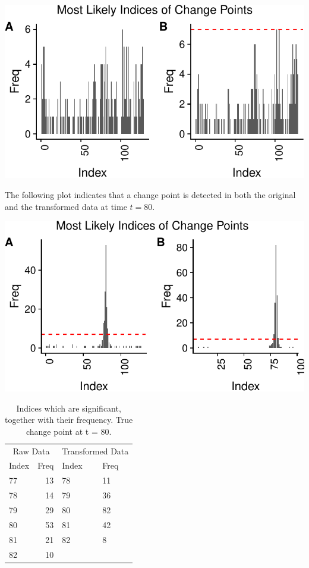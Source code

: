 \documentclass[smallextended]{svjour3}       %
\begin{document}
\begin{center}\includegraphics{springer_template_files/figure-latex/chunk_3-1} \end{center}

The following plot indicates that a change point is detected in both the
original and the transformed data at time \(t = 80\).

\begin{center}\includegraphics{springer_template_files/figure-latex/chunk_4_5-1} \end{center}

\begin{longtable}[t]{lrll}
\caption{\label{tab:chunk_4_5}Indices which are significant, together with their frequency. True change point at t = 80.}\\
\toprule
\multicolumn{2}{c}{Raw Data} & \multicolumn{2}{c}{Transformed Data} \\
\cmidrule(l{2pt}r{2pt}){1-2} \cmidrule(l{2pt}r{2pt}){3-4}
Index & Freq & Index & Freq\\
\midrule
77 & 13 & 78 & 11\\
78 & 14 & 79 & 36\\
79 & 29 & 80 & 82\\
80 & 53 & 81 & 42\\
81 & 21 & 82 & 8\\
82 & 10 &  & \\
\bottomrule
\end{longtable}
\end{document}
